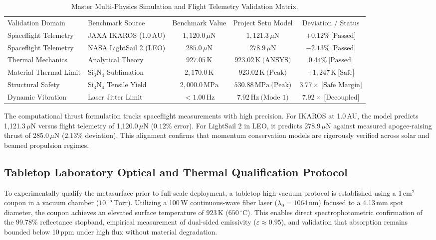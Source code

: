 \documentclass[aps,prd,reprint,superscriptaddress,nofootinbib,floatfix]{revtex4-2}
\begin{document}
\begin{table}[t]
\caption{Master Multi-Physics Simulation and Flight Telemetry Validation Matrix.}
\label{tab:table4}
\begin{ruledtabular}
\renewcommand{\arraystretch}{1.05}
\begin{tabular*}{\textwidth}{@{\extracolsep{\fill}}llccc@{}}
Validation Domain & Benchmark Source & Benchmark Value & Project Setu Model & Deviation / Status \\
\colrule
Spaceflight Telemetry & JAXA IKAROS ($1.0\,\mathrm{AU}$) & $1,120.0\,\mu\mathrm{N}$ & $1,121.3\,\mu\mathrm{N}$ & $+0.12\%\ \text{[Passed]}$ \\
Spaceflight Telemetry & NASA LightSail 2 (LEO) & $285.0\,\mu\mathrm{N}$ & $278.9\,\mu\mathrm{N}$ & $-2.13\%\ \text{[Passed]}$ \\
Thermal Mechanics & Analytical Theory & $927.05\,\mathrm{K}$ & $923.02\,\mathrm{K}\ \text{(ANSYS)}$ & $0.44\%\ \text{[Passed]}$ \\
Material Thermal Limit & $\mathrm{Si}_3\mathrm{N}_4$ Sublimation & $2,170.0\,\mathrm{K}$ & $923.02\,\mathrm{K}\ \text{(Peak)}$ & $+1,247\,\mathrm{K}\ \text{[Safe]}$ \\
Structural Safety & $\mathrm{Si}_3\mathrm{N}_4$ Tensile Yield & $2,000.0\,\mathrm{MPa}$ & $530.88\,\mathrm{MPa}\ \text{(Peak)}$ & $3.77\times\ \text{[Safe Margin]}$ \\
Dynamic Vibration & Laser Jitter Limit & $< 1.00\,\mathrm{Hz}$ & $7.92\,\mathrm{Hz}\ \text{(Mode 1)}$ & $7.92\times\ \text{[Decoupled]}$ \\
\end{tabular*}
\end{ruledtabular}
\end{table}

The computational thrust formulation tracks spaceflight measurements with high precision. For IKAROS at 1.0\,AU, the model predicts 1,121.3\,$\mu\mathrm{N}$ versus flight telemetry of 1,120.0\,$\mu\mathrm{N}$ ($0.12\%$ error). For LightSail 2 in LEO, it predicts 278.9\,$\mu\mathrm{N}$ against measured apogee-raising thrust of 285.0\,$\mu\mathrm{N}$ ($2.13\%$ deviation). This alignment confirms that momentum conservation models are rigorously verified across solar and beamed propulsion regimes.

\subsection{Tabletop Laboratory Optical and Thermal Qualification Protocol}
To experimentally qualify the metasurface prior to full-scale deployment, a tabletop high-vacuum protocol is established using a 1\,$\mathrm{cm}^2$ coupon in a vacuum chamber ($10^{-5}\,\mathrm{Torr}$). Utilizing a 100\,W continuous-wave fiber laser ($\lambda_0=1064\,\mathrm{nm}$) focused to a 4.13\,mm spot diameter, the coupon achieves an elevated surface temperature of $923\,\mathrm{K}$ ($650\,^\circ\mathrm{C}$). This enables direct spectrophotometric confirmation of the 99.78\% reflectance stopband, empirical measurement of dual-sided emissivity ($\varepsilon \approx 0.95$), and validation that absorption remains bounded below 10\,ppm under high flux without material degradation.
\end{document}
